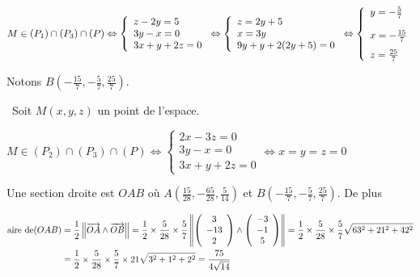 {{\begin{center}
$M\in(P_1)\cap(P_3)\cap(P)\Leftrightarrow
\left\{
\begin{array}{l}
z-2y=5\\
3y-x=0\\
3x+y+2z=0
\end{array}
\right.\Leftrightarrow\left\{
\begin{array}{l}
z=2y+5\\
x=3y\\
9y+y+2(2y+5)=0
\end{array}
\right.\Leftrightarrow\left\{
\begin{array}{l}
y=-\frac{5}{7}\\
x=-\frac{15}{7}\rule[-4mm]{0mm}{11mm}\\
z=\frac{25}{7}
\end{array}
\right.$
\end{center}
Notons $B\left(-\frac{15}{7},-\frac{5}{7},\frac{25}{7}\right)$.

\textbullet~Soit $M(x,y,z)$ un point de l'espace.

\begin{center}
$M\in(P_2)\cap(P_3)\cap(P)\Leftrightarrow
\left\{
\begin{array}{l}
2x-3z=0\\
3y-x=0\\
3x+y+2z=0
\end{array}
\right.\Leftrightarrow x=y=z=0$
\end{center}
Une section droite est $OAB$ où $A\left(\frac{15}{28},-\frac{65}{28},\frac{5}{14}\right)$ et $B\left(-\frac{15}{7},-\frac{5}{7},\frac{25}{7}\right)$. De plus

\begin{align*}\ensuremath
\text{aire de}(OAB)&=\frac{1}{2}\left\|\overrightarrow{OA}\wedge\overrightarrow{OB}\right\|=\frac{1}{2}\times\frac{5}{28}\times\frac{5}{7}\left\|\left(
\begin{array}{c}
3\\
-13\\
2
\end{array}\right)
\wedge
\left(
\begin{array}{c}
-3\\
-1\\
5
\end{array}\right)\right\|=\frac{1}{2}\times\frac{5}{28}\times\frac{5}{7}\sqrt{63^2+21^2+42^2}\\
 &=\frac{1}{2}\times\frac{5}{28}\times\frac{5}{7}\times21\sqrt{3^2+1^2+2^2}=\frac{75}{4\sqrt{14}}
\end{align*}
\begin{center}
\end{center}}
}